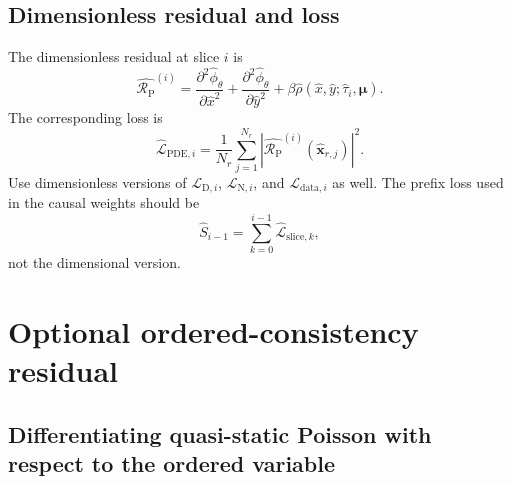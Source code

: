 \documentclass[11pt]{article}
\newcommand{\xv}{\bm{x}}
\newcommand{\muv}{\bm{\mu}}
\newcommand{\Rpoisson}{\mathcal{R}_{\mathrm{P}}}
\newcommand{\taud}{\tau}
\begin{document}
\subsection{Dimensionless residual and loss}

The dimensionless residual at slice $i$ is
\begin{equation}
\hat{\Rpoisson}^{(i)}
=\frac{\partial^2\hat{\phi}_{\theta}}{\partial\hat{x}^2}
+\frac{\partial^2\hat{\phi}_{\theta}}{\partial\hat{y}^2}
+\beta\hat{\rho}(\hat{x},\hat{y};\hat{\taud}_i,\muv).
\label{eq:dimensionless_slice_residual}
\end{equation}
The corresponding loss is
\begin{equation}
\widehat{\mathcal{L}}_{\mathrm{PDE},i}=\frac{1}{N_r}\sum_{j=1}^{N_r}\left|\hat{\Rpoisson}^{(i)}(\hat{\xv}_{r,j})\right|^2.
\label{eq:dimensionless_slice_pde_loss}
\end{equation}
Use dimensionless versions of $\mathcal{L}_{\mathrm{D},i}$, $\mathcal{L}_{\mathrm{N},i}$, and $\mathcal{L}_{\mathrm{data},i}$ as well. The prefix loss used in the causal weights should be
\begin{equation}
\hat{S}_{i-1}=\sum_{k=0}^{i-1}\widehat{\mathcal{L}}_{\mathrm{slice},k},
\label{eq:dimensionless_prefix_loss}
\end{equation}
not the dimensional version.

\section{Optional ordered-consistency residual}

\subsection{Differentiating quasi-static Poisson with respect to the ordered variable}
\end{document}
